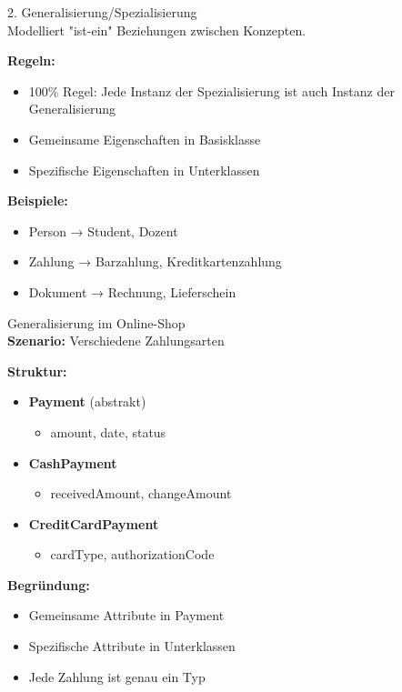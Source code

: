 \begin{concept}{2. Generalisierung/Spezialisierung}\\
Modelliert "ist-ein" Beziehungen zwischen Konzepten.

\textbf{Regeln:}
\begin{itemize}
    \item 100\% Regel: Jede Instanz der Spezialisierung ist auch Instanz der Generalisierung
    \item Gemeinsame Eigenschaften in Basisklasse
    \item Spezifische Eigenschaften in Unterklassen
\end{itemize}

\textbf{Beispiele:}
\begin{itemize}
    \item Person → Student, Dozent
    \item Zahlung → Barzahlung, Kreditkartenzahlung
    \item Dokument → Rechnung, Lieferschein
\end{itemize}
\end{concept}

\begin{example2}{Generalisierung im Online-Shop}\\
\textbf{Szenario:} Verschiedene Zahlungsarten

\textbf{Struktur:}
\begin{itemize}
    \item \textbf{Payment} (abstrakt)
    \begin{itemize}
        \item amount, date, status
    \end{itemize}
    \item \textbf{CashPayment}
    \begin{itemize}
        \item receivedAmount, changeAmount
    \end{itemize}
    \item \textbf{CreditCardPayment}
    \begin{itemize}
        \item cardType, authorizationCode
    \end{itemize}
\end{itemize}

\textbf{Begründung:}
\begin{itemize}
    \item Gemeinsame Attribute in Payment
    \item Spezifische Attribute in Unterklassen
    \item Jede Zahlung ist genau ein Typ
\end{itemize}
\end{example2}

